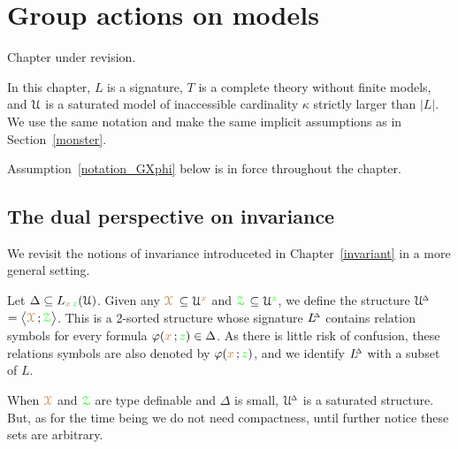 \chapter{Group actions on models}
\label{actions}

\def\medrel#1{\parbox[t]{5ex}{$\displaystyle\hfil #1$}}
\def\ceq#1#2#3{\parbox[t]{17ex}{$\displaystyle #1$}\medrel{#2}{$\displaystyle #3$}}

\noindent\llap{\textcolor{red}{\Large\warning}\kern1.5ex}\ignorespaces
Chapter under revision.

In this chapter, $L$ is a signature, $T$ is a complete theory without finite models, and $\EuScript U$ is a saturated model of inaccessible cardinality $\kappa$ strictly larger than $|L|$.
We use the same notation and make the same implicit assumptions as in Section~\ref{monster}.

Assumption~\ref{notation_GXphi} below is in force throughout the chapter.

\section{The dual perspective on invariance}\label{dual_perspective}

We revisit the notions of invariance introduceted in Chapter~\ref{invariant} in a more general setting.

\begin{assumption}\label{notation_GXphi}
Let $\Delta\subseteq L_{{\color{brown} x}\,{\color{green} z}}(\EuScript U)$.
Given any \emph{${\color{brown}\EuScript X}$\/} $\subseteq\EuScript U^{\color{brown} x}$ and \emph{${\color{green}\EuScript Z}$\/} $\subseteq\EuScript U^{\color{green} z}$, we define the structure \emph{$\EuScript U\kern-.2ex^{\scriptscriptstyle\Delta}$\/} $=\big\langle{\color{brown}\EuScript X}\,;{\color{green}\EuScript Z}\big\rangle$.
This is a 2-sorted structure whose signature  \emph{$L\kern-.5ex^{\scriptscriptstyle\Delta}$\/} contains relation symbols for every formula $\varphi({\color{brown} x}\,;{\color{green} z})\in\Delta$.
As there is little risk of confusion, these relations symbols are also denoted by $\varphi({\color{brown} x}\,;{\color{green} z})$, and we identify $L\kern-.5ex^{\scriptscriptstyle\Delta}$ with a subset of $L$. 
\end{assumption}

When ${\color{brown}\EuScript X}$ and ${\color{green}\EuScript Z}$ are type definable and $\Delta$ is small, $\EuScript U\kern-.2ex^{\scriptscriptstyle\Delta}$ is a saturated structure.
But, as for the time being we do not need compactness, until further notice these sets are arbitrary.

